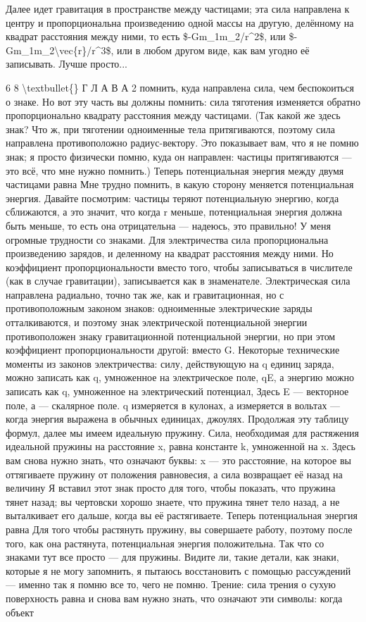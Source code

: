 \documentclass[10pt,oneside]{article}
\begin{document}
Далее идет гравитация в пространстве между частицами; эта сила направлена к центру и пропорциональна произведению одной массы на другую, делённому на квадрат расстояния между ними, то есть \$-Gm\_1m\_2/r\textasciicircum{}2\$, или \$-Gm\_1m\_2\textbackslash{}vec\{r\}/r\textasciicircum{}3\$, или в любом другом виде, как вам угодно её записывать. Лучше просто...\par

6 8 \textbackslash{}textbullet\{\} Г Л А В А  2 помнить, куда направлена сила, чем беспокоиться о знаке. Но вот эту часть вы должны помнить: сила тяготения изменяется обратно пропорционально квадрату расстояния между частицами. (Так какой же здесь знак? Что ж, при тяготении одноименные тела притягиваются, поэтому сила направлена противоположно радиус-вектору. Это показывает вам, что я не помню знак; я просто физически помню, куда он направлен: частицы притягиваются --- это всё, что мне нужно помнить.) Теперь потенциальная энергия между двумя частицами равна Мне трудно помнить, в какую сторону меняется потенциальная энергия. Давайте посмотрим: частицы теряют потенциальную энергию, когда сближаются, а это значит, что когда r меньше, потенциальная энергия должна быть меньше, то есть она отрицательна --- надеюсь, это правильно! У меня огромные трудности со знаками. Для электричества сила пропорциональна произведению зарядов, и деленному на квадрат расстояния между ними. Но коэффициент пропорциональности вместо того, чтобы записываться в числителе (как в случае гравитации), записывается как в знаменателе. Электрическая сила направлена радиально, точно так же, как и гравитационная, но с противоположным законом знаков: одноименные электрические заряды отталкиваются, и поэтому знак электрической потенциальной энергии противоположен знаку гравитационной потенциальной энергии, но при этом коэффициент пропорциональности другой: вместо G. Некоторые технические моменты из законов электричества: силу, действующую на q единиц заряда, можно записать как q, умноженное на электрическое поле, qE, а энергию можно записать как q, умноженное на электрический потенциал, Здесь E --- векторное поле, а --- скалярное поле. q измеряется в кулонах, а измеряется в вольтах --- когда энергия выражена в обычных единицах, джоулях. Продолжая эту таблицу формул, далее мы имеем идеальную пружину. Сила, необходимая для растяжения идеальной пружины на расстояние x, равна константе k, умноженной на x. Здесь вам снова нужно знать, что означают буквы: x --- это расстояние, на которое вы оттягиваете пружину от положения равновесия, а сила возвращает её назад на величину Я вставил этот знак просто для того, чтобы показать, что пружина тянет назад; вы чертовски хорошо знаете, что пружина тянет тело назад, а не выталкивает его дальше, когда вы её растягиваете. Теперь потенциальная энергия равна Для того чтобы растянуть пружину, вы совершаете работу, поэтому после того, как она растянута, потенциальная энергия положительна. Так что со знаками тут все просто --- для пружины. Видите ли, такие детали, как знаки, которые я не могу запомнить, я пытаюсь восстановить с помощью рассуждений --- именно так я помню все то, чего не помню. Трение: сила трения о сухую поверхность равна и снова вам нужно знать, что означают эти символы: когда объект 
\end{document}
